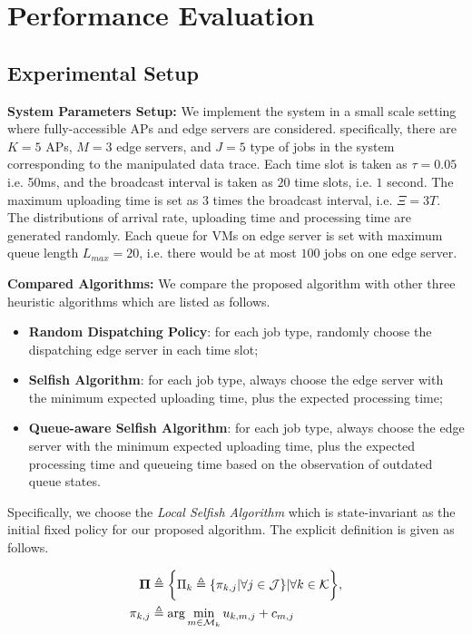 \section{Performance Evaluation}
\label{sec:evaluation}

\subsection{Experimental Setup}
\textbf{System Parameters Setup:}
We implement the system in a small scale setting where fully-accessible APs and edge servers are considered.
specifically, there are $K=5$ APs, $M=3$ edge servers, and $J=5$ type of jobs in the system corresponding to the manipulated data trace.
Each time slot is taken as $\tau = 0.05$ i.e. 50ms, and the broadcast interval is taken as $20$ time slots, i.e. $1$ second.
The maximum uploading time is set as $3$ times the broadcast interval, i.e. $\Xi = 3T$.
The distributions of arrival rate, uploading time and processing time are generated randomly.
Each queue for VMs on edge server is set with maximum queue length $L_{max}=20$, i.e. there would be at most $100$ jobs on one edge server.

\textbf{Compared Algorithms:}
We compare the proposed algorithm with other three heuristic algorithms which are listed as follows.
\begin{itemize}
    \item \textbf{Random Dispatching Policy}:
            for each job type, randomly choose the dispatching edge server in each time slot; 
    \item \textbf{Selfish Algorithm}:
            for each job type, always choose the edge server with the minimum expected uploading time, plus the expected processing time;
    \item \textbf{Queue-aware Selfish Algorithm}:
            for each job type, always choose the edge server with the minimum expected uploading time, plus the expected processing time and queueing time based on the observation of outdated queue states.
\end{itemize}
Specifically, we choose the \emph{Local Selfish Algorithm} which is state-invariant as the initial fixed policy for our proposed algorithm.
The explicit definition is given as follows.
\begin{policy}
    \begin{align}
        \boldsymbol{\Pi} &\triangleq \bigg\{ \Pi_{k}\triangleq\{\pi_{k,j}|\forall j\in\mathcal{J}\} |\forall k\in\mathcal{K} \bigg\},
        \\
        \pi_{k,j} &\triangleq \arg\min_{m\in\mathcal{M}_{k}} u_{k,m,j} + c_{m,j}
    \end{align} 
\end{policy}

